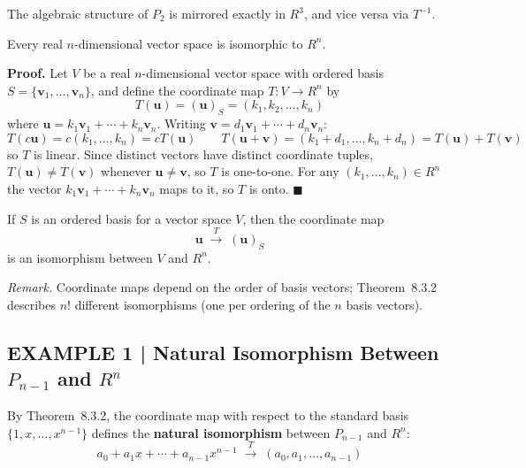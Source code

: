 \documentclass{article}
\begin{document}
The algebraic structure of $P_2$ is mirrored exactly in $R^3$, and vice versa via $T^{-1}$.

\begin{tcolorbox}[colback=red!4, colframe=red!60!black,
  title={\textbf{Theorem 8.3.1}}, boxrule=0.5mm, arc=3mm]
Every real $n$-dimensional vector space is isomorphic to $R^n$.
\end{tcolorbox}

\textbf{Proof.} Let $V$ be a real $n$-dimensional vector space with ordered basis
$S = \{\mathbf{v}_1, \ldots, \mathbf{v}_n\}$, and define the coordinate map $T : V \to R^n$ by
\begin{equation}
  T(\mathbf{u}) = (\mathbf{u})_S = (k_1, k_2, \ldots, k_n) \tag{2}
\end{equation}
where $\mathbf{u} = k_1\mathbf{v}_1 + \cdots + k_n\mathbf{v}_n$. Writing
$\mathbf{v} = d_1\mathbf{v}_1+\cdots+d_n\mathbf{v}_n$:
\[
  T(c\mathbf{u}) = c(k_1,\ldots,k_n) = cT(\mathbf{u}) \qquad
  T(\mathbf{u}+\mathbf{v}) = (k_1+d_1,\ldots,k_n+d_n) = T(\mathbf{u})+T(\mathbf{v})
\]
so $T$ is linear. Since distinct vectors have distinct coordinate tuples,
$T(\mathbf{u})\neq T(\mathbf{v})$ whenever $\mathbf{u}\neq\mathbf{v}$, so $T$ is one-to-one.
For any $(k_1,\ldots,k_n)\in R^n$ the vector $k_1\mathbf{v}_1+\cdots+k_n\mathbf{v}_n$
maps to it, so $T$ is onto. $\blacksquare$

\begin{tcolorbox}[colback=red!4, colframe=red!60!black,
  title={\textbf{Theorem 8.3.2}}, boxrule=0.5mm, arc=3mm]
If $S$ is an ordered basis for a vector space $V$, then the coordinate map
\[
  \mathbf{u} \;\xrightarrow{\;T\;}\; (\mathbf{u})_S
\]
is an isomorphism between $V$ and $R^n$.
\end{tcolorbox}

\textit{Remark.} Coordinate maps depend on the order of basis vectors; Theorem~8.3.2 describes
$n!$ different isomorphisms (one per ordering of the $n$ basis vectors).

\subsection*{EXAMPLE 1 | Natural Isomorphism Between $P_{n-1}$ and $R^n$}

By Theorem~8.3.2, the coordinate map with respect to the standard basis $\{1,x,\ldots,x^{n-1}\}$
defines the \textbf{natural isomorphism} between $P_{n-1}$ and $R^n$:
\[
  a_0 + a_1 x + \cdots + a_{n-1}x^{n-1} \;\xrightarrow{\;T\;}\; (a_0, a_1, \ldots, a_{n-1})
\]
\end{document}
